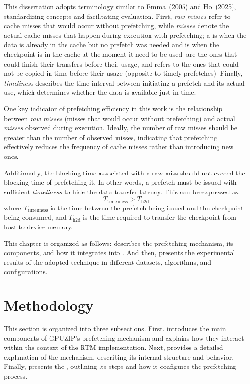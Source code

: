 \documentclass[Ingles,Final]{ic-tese-v3}
\begin{document}
This dissertation adopts terminology similar to Emma~\etal (2005)\cite{emma2005} and Ho~\etal (2025)\cite{ho2025}, standardizing concepts and facilitating evaluation. First, \textit{raw misses} refer to cache misses that would occur without prefetching, while \textit{misses} denote the actual cache misses that happen during execution with prefetching; a  is when the data is already in the cache but no prefetch was needed and  is when the checkpoint is in the cache at the moment it need to be used.  are the ones that could finish their transfers before their usage, and  refers to the ones that could not be copied in time before their usage (opposite to timely prefetches). Finally, \textit{timeliness} describes the time interval between initiating a prefetch and its actual use, which determines whether the data is available just in time.

One key indicator of prefetching efficiency in this work is the relationship between \textit{raw misses} (misses that would occur without prefetching) and actual \textit{misses} observed during execution. Ideally, the number of raw misses should be greater than the number of observed misses, indicating that prefetching effectively reduces the frequency of cache misses rather than introducing new ones.

Additionally, the blocking time associated with a raw miss should not exceed the blocking time of prefetching it. In other words, a prefetch must be issued with sufficient \textit{timeliness} to hide the data transfer latency. This can be expressed as:
\[
T_{\text{timeliness}} > T_{\text{h2d}}
\]
where $T_{\text{timeliness}}$ is the time between the prefetch being issued and the checkpoint being consumed, and $T_{\text{h2d}}$ is the time required to transfer the checkpoint from host to device memory.

This chapter is organized as follows:  describes the prefetching mechanism, its components, and how it integrates into \awave. And then,  presents the experimental results of the adopted technique in different datasets, \checkpointing algorithms, and configurations.


\section{Methodology}
\label{sec:prefetch_methodology}

This section is organized into three subsections. First,  introduces the main components of GPUZIP’s prefetching mechanism and explains how they interact within the context of the \awave RTM implementation. Next,  provides a detailed explanation of the \cache mechanism, describing its internal structure and behavior. Finally,  presents the \psa, outlining its steps and how it configures the prefetching process.
\end{document}
